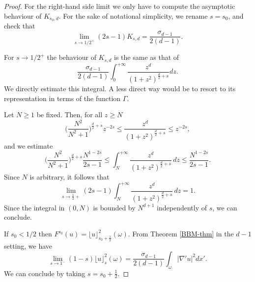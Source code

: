 \documentclass[11pt]{article}
\begin{document}
\begin{proof}
For the right-hand side limit we only have to compute the asymptotic behaviour of $K_{s_0,d}$.
For the sake of notational simplicity, we rename $s=s_0$,
and check that
$$
\lim_{s\to 1/2^+}(2s-1)K_{s,d}= \frac{
\sigma_{d-1}}{2(d-1)}. 
$$

For $s\to 1/2^+$ the behaviour of $K_{s,d}$ is the same as that of 
$$\frac{\sigma_{d-1}}{2(d-1)}\int_0^{+\infty}\frac{z^d}{(1+z^2)^{\frac d2+s}}dz
.$$
We directly estimate this integral. A less direct way would be to resort to its representation in terms of the function $\Gamma$.

Let $N\geq 1$ be fixed. 
Then, for all $z\geq N$ 
$$\Big(\frac{N^2}{N^2+1}\Big)^{\frac d2+s}z^{-2s} \leq \frac{z^d}{(1+z^2)^{\frac d2+s}}\leq z^{-2s},$$ 
and we estimate 
$$\Big(\frac{N^2}{N^2+1}\Big)^{\frac d2+s}\frac{N^{1-2s}}{2s-1} \leq \int_N^{+\infty}\frac{z^d}{(1+z^2)^{\frac d2+s}}\, dz \leq 
\frac{N^{1-2s}}{2s-1}.$$ 
Since $N$ is arbitrary, it follows that 
$$\lim_{s\to\frac{1}{2}+}(2s-1)\int_N^{+\infty}\frac{z^d}{(1+z^2)^{\frac d2+s}}\, dz =1.$$ 
Since the integral in $(0,N)$ is bounded by $N^{d+1}$ independently of $s$, we can conclude.

    If $s_0<1/2$ then $F^{s_0}(u)=\lfloor u   \rfloor^2_{s_0+\frac12}(
    \omega)$. From Theorem 
    \ref{BBM-thm} in the $d-1$ setting, we have 
    $$
    \lim_{s\to 1^-}(1-s)\lfloor u   \rfloor^2_{s}(
    \omega)=\frac{
\sigma_{d-1}}{2(d-1)}\int_\omega |\nabla'u|^2dx'.$$
We can conclude by  taking $s=s_0+\frac12$.
\end{proof}
\end{document}
